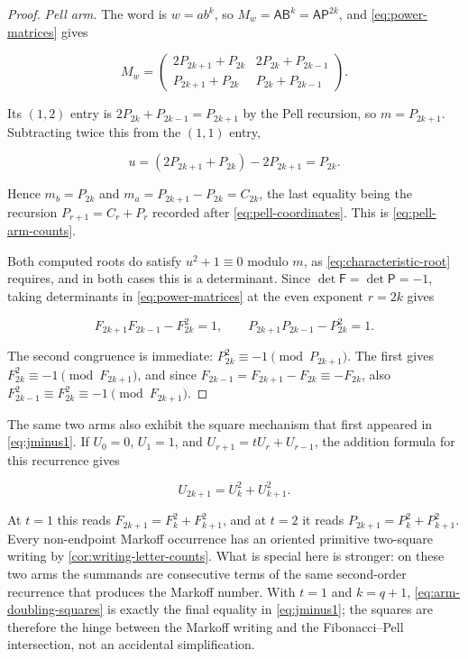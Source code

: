 \begin{proof}
\emph{Pell arm.} The word is $w=ab^{k}$, so
$M_w=\mathsf A\mathsf B^{k}=\mathsf A\mathsf P^{2k}$, and
\cref{eq:power-matrices} gives

\begin{equation}
 M_w=
 \begin{pmatrix}
 2P_{2k+1}+P_{2k} & 2P_{2k}+P_{2k-1}\\
 P_{2k+1}+P_{2k} & P_{2k}+P_{2k-1}
 \end{pmatrix}.
\end{equation}

Its $(1,2)$ entry is $2P_{2k}+P_{2k-1}=P_{2k+1}$ by the Pell recursion, so
$m=P_{2k+1}$. Subtracting twice this from the $(1,1)$ entry,

\begin{equation}
 u=(2P_{2k+1}+P_{2k})-2P_{2k+1}=P_{2k}.
\end{equation}

Hence $m_b=P_{2k}$ and $m_a=P_{2k+1}-P_{2k}=C_{2k}$, the last equality being
the recursion $P_{r+1}=C_r+P_r$ recorded after
\cref{eq:pell-coordinates}. This is \cref{eq:pell-arm-counts}.

Both computed roots do satisfy $u^2+1\equiv0$ modulo $m$, as
\cref{eq:characteristic-root} requires, and in both cases this is a
determinant. Since $\det\mathsf F=\det\mathsf P=-1$, taking determinants in
\cref{eq:power-matrices} at the even exponent $r=2k$ gives

\begin{equation}
 F_{2k+1}F_{2k-1}-F_{2k}^2=1,
 \qquad
 P_{2k+1}P_{2k-1}-P_{2k}^2=1.
 \label{eq:cassini-even}
\end{equation}

The second congruence is immediate: $P_{2k}^2\equiv-1\pmod{P_{2k+1}}$. The
first gives $F_{2k}^2\equiv-1\pmod{F_{2k+1}}$, and since
$F_{2k-1}=F_{2k+1}-F_{2k}\equiv-F_{2k}$, also
$F_{2k-1}^2\equiv F_{2k}^2\equiv-1\pmod{F_{2k+1}}$.
\end{proof}

The same two arms also exhibit the square mechanism that first appeared in
\cref{eq:jminus1}. If $U_0=0$, $U_1=1$, and
$U_{r+1}=tU_r+U_{r-1}$, the addition formula for this recurrence gives

\begin{equation}
 U_{2k+1}=U_k^2+U_{k+1}^2.
 \label{eq:arm-doubling-squares}
\end{equation}

At $t=1$ this reads
$F_{2k+1}=F_k^2+F_{k+1}^2$, and at $t=2$ it reads
$P_{2k+1}=P_k^2+P_{k+1}^2$. Every non-endpoint Markoff occurrence has an
oriented primitive two-square writing by \cref{cor:writing-letter-counts}.
What is special here is stronger: on these two arms the summands are
consecutive terms of the same second-order recurrence that produces the
Markoff number. With $t=1$ and
$k=q+1$, \cref{eq:arm-doubling-squares} is exactly the final equality in
\cref{eq:jminus1}; the squares are therefore the hinge between the Markoff
writing and the Fibonacci--Pell intersection, not an accidental
simplification.

